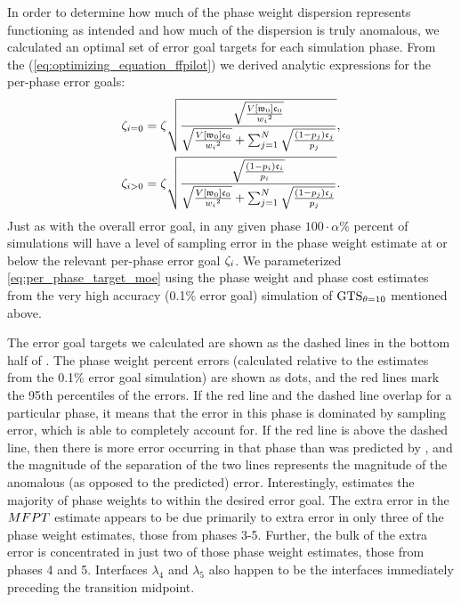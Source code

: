 In order to determine how much of the phase weight dispersion represents  functioning as intended and how much of the dispersion is truly anomalous, we calculated an optimal set of error goal targets for each simulation phase. From the \opteq{} (\eqref{eq:optimizing_equation_ffpilot}) we derived analytic expressions for the per-phase error goals:
    \begin{align}
        \label{eq:per_phase_target_moe}
        \begin{split}
            {\zeta}_{i=0} &= \zeta \sqrt{\frac{\sqrt{\frac{V \left[ \mathfrak{w}_{0} \right] \mathfrak{c}_{0}}{w_{i} {}^2}}}{\sqrt{\frac{V \left[ \mathfrak{w}_{0} \right] \mathfrak{c}_{0}}{w_{i} {}^2}} + \sum_{j=1}^{N} \sqrt{\frac{\left(1 - p_j\right) \mathfrak{c}_{j}}{p_j}}}}, \\
            {\zeta}_{i>0} &= \zeta \sqrt{\frac{\sqrt{\frac{\left(1 - p_i\right) \mathfrak{c}_{i}}{p_i}}}{\sqrt{\frac{V \left[ \mathfrak{w}_{0} \right] \mathfrak{c}_{0}}{w_{i} {}^2}} + \sum_{j=1}^{N} \sqrt{\frac{\left(1-p_j\right) \mathfrak{c}_{j}}{p_j}}}}.
        \end{split}
    \end{align}
Just as with the overall error goal, in any given phase $100\cdot\alpha\%$ percent of simulations will have a level of sampling error in the phase weight estimate at or below the relevant per-phase error goal ${\zeta}_{i}$. We parameterized \eqref{eq:per_phase_target_moe} using the phase weight and phase cost estimates from the very high accuracy (0.1\% error goal)  simulation of $\text{GTS}_{\theta=10}$ mentioned above.

The error goal targets we calculated are shown as the dashed lines in the bottom half of . The phase weight percent errors (calculated relative to the estimates from the 0.1\% error goal simulation) are shown as dots, and the red lines mark the 95th percentiles of the errors. If the red line and the dashed line overlap for a particular phase, it means that the error in this phase is dominated by sampling error, which  is able to completely account for. If the red line is above the dashed line, then there is more error occurring in that phase than was predicted by , and the magnitude of the separation of the two lines represents the magnitude of the anomalous (as opposed to the predicted) error. Interestingly,  estimates the majority of phase weights to within the desired error goal. The extra error in the $MFPT$ estimate appears to be due primarily to extra error in only three of the phase weight estimates, those from phases 3-5. Further, the bulk of the extra error is concentrated in just two of those phase weight estimates, those from phases 4 and 5. Interfaces $\lambda_4$ and $\lambda_5$ also happen to be the interfaces immediately preceding the transition midpoint.

